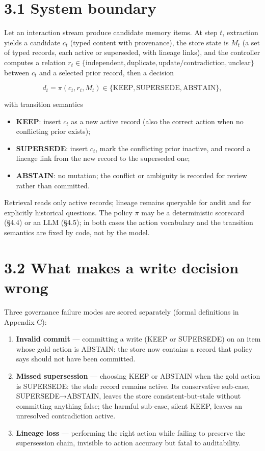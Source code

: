 \section{3.1 System boundary}\label{system-boundary}

Let an interaction stream produce candidate memory items. At step \(t\),
extraction yields a candidate \(c_t\) (typed content with provenance),
the store state is \(M_t\) (a set of typed records, each active or
superseded, with lineage links), and the controller computes a relation
\(r_t \in \{\text{independent}, \text{duplicate}, \text{update/contradiction}, \text{unclear}\}\)
between \(c_t\) and a selected prior record, then a decision

\[
d_t = \pi(c_t, r_t, M_t) \in \{\text{KEEP}, \text{SUPERSEDE}, \text{ABSTAIN}\},
\]

with transition semantics

\begin{itemize}
\tightlist
\item
  \textbf{KEEP}: insert \(c_t\) as a new active record (also the correct
  action when no conflicting prior exists);
\item
  \textbf{SUPERSEDE}: insert \(c_t\), mark the conflicting prior
  inactive, and record a lineage link from the new record to the
  superseded one;
\item
  \textbf{ABSTAIN}: no mutation; the conflict or ambiguity is recorded
  for review rather than committed.
\end{itemize}

Retrieval reads only active records; lineage remains queryable for audit
and for explicitly historical questions. The policy \(\pi\) may be a
deterministic scorecard (§4.4) or an LLM (§4.5); in both cases the
action vocabulary and the transition semantics are fixed by code, not by
the model.

\section{3.2 What makes a write decision
wrong}\label{what-makes-a-write-decision-wrong}

Three governance failure modes are scored separately (formal definitions
in Appendix C):

\begin{enumerate}
\def\labelenumi{\arabic{enumi}.}
\tightlist
\item
  \textbf{Invalid commit} --- committing a write (KEEP or SUPERSEDE) on
  an item whose gold action is ABSTAIN: the store now contains a record
  that policy says should not have been committed.
\item
  \textbf{Missed supersession} --- choosing KEEP or ABSTAIN when the
  gold action is SUPERSEDE: the stale record remains active. Its
  conservative sub-case, SUPERSEDE→ABSTAIN, leaves the store
  consistent-but-stale without committing anything false; the harmful
  sub-case, silent KEEP, leaves an unresolved contradiction active.
\item
  \textbf{Lineage loss} --- performing the right action while failing to
  preserve the supersession chain, invisible to action accuracy but
  fatal to auditability.
\end{enumerate}

